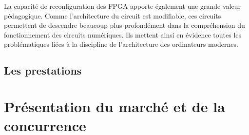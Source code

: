 \documentclass[a4paper,12pt]{report}
\begin{document}
La capacité de reconfiguration des FPGA apporte également une grande valeur pédagogique.
Comme l'architecture du circuit est modifiable, ces circuits permettent de descendre beaucoup plus profondément dans la compréhension du fonctionnement des circuits numériques.
Ils mettent ainsi en évidence toutes les problématiques liées à la discipline de l'architecture des ordinateurs modernes.\\


%


\subsection{Les prestations}

\section{Présentation du marché et de la concurrence}
\end{document}
